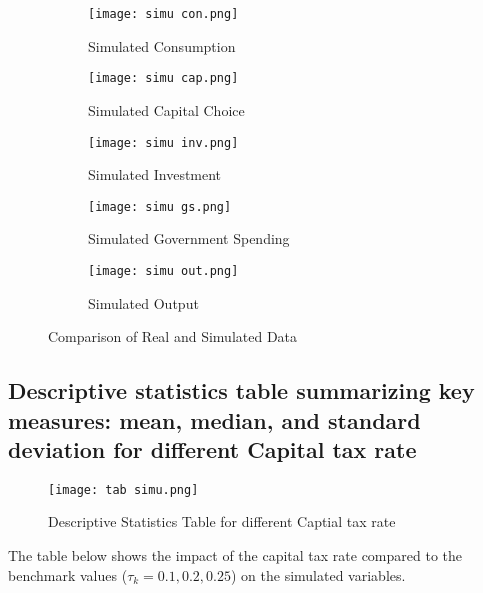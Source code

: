 \documentclass{article}
\begin{document}
\begin{figure}[H]
    \centering
    \begin{subfigure}{0.48\textwidth}
        \centering
        \texttt{[image: simu con.png]}
        \caption{Simulated Consumption}
        \label{fig:image1}
    \end{subfigure}
    \hfill
    \begin{subfigure}{0.48\textwidth}
        \centering
        \texttt{[image: simu cap.png]}
        \caption{Simulated Capital Choice}
        \label{fig:image2}
    \end{subfigure}

    \begin{subfigure}{0.48\textwidth}
        \centering
        \texttt{[image: simu inv.png]}
        \caption{Simulated Investment}
        \label{fig:image3}
    \end{subfigure}
    \hfill
    \begin{subfigure}{0.48\textwidth}
        \centering
        \texttt{[image: simu gs.png]}
        \caption{Simulated Government Spending}
        \label{fig:image4}
    \end{subfigure}

    \begin{subfigure}{0.6\textwidth}
        \centering
        \texttt{[image: simu out.png]}
        \caption{Simulated Output}
        \label{fig:image5}
    \end{subfigure}

    \caption{Comparison of Real and Simulated Data}
    \label{fig:comparison}
\end{figure}

\subsection*{Descriptive statistics table summarizing key measures: mean, median, and standard deviation for different Capital tax rate}


\begin{figure}[H]
    \centering
    \texttt{[image: tab simu.png]}
    \caption{Descriptive Statistics Table for different Captial tax rate}
    \label{fig:gdp}
\end{figure}

The table below shows the impact of the capital tax rate compared to the benchmark values (\(\tau_k = 0.1, 0.2, 0.25\)) on the simulated variables.
\end{document}
